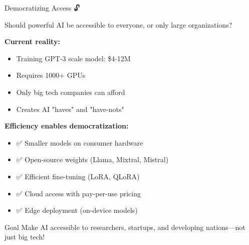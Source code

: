 \documentclass[aspectratio=169]{beamer}
\begin{document}
\begin{frame}[shrink=10]{Democratizing Access 🔓}
\begin{discussionbox}
Should powerful AI be accessible to everyone, or only large organizations?
\end{discussionbox}

\vspace{0.5em}

\textbf{Current reality:}
\begin{itemize}\setlength{\itemsep}{0pt}
    \item Training GPT-3 scale model: \$4-12M
    \item Requires 1000+ GPUs
    \item Only big tech companies can afford
    \item Creates AI "haves" and "have-nots"
\end{itemize}

\vspace{0.5em}

\textbf{Efficiency enables democratization:}
\begin{itemize}\setlength{\itemsep}{0pt}
    \item ✅ Smaller models on consumer hardware
    \item ✅ Open-source weights (Llama, Mixtral, Mistral)
    \item ✅ Efficient fine-tuning (LoRA, QLoRA)
    \item ✅ Cloud access with pay-per-use pricing
    \item ✅ Edge deployment (on-device models)
\end{itemize}

\vspace{0.5em}

\begin{alertblock}{Goal}
Make AI accessible to researchers, startups, and developing nations—not just big tech!
\end{alertblock}
\end{frame}
\end{document}
